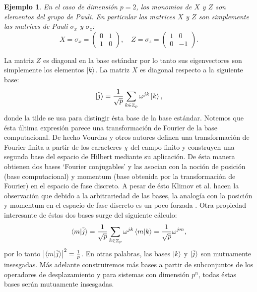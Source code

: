 \documentclass[a4paper]{report}
\DeclareMathOperator{\Z}{\mathbb{Z}}
\newtheorem{example}{Ejemplo}
\begin{document}
  \begin{example}
    En el caso de dimensión $p = 2$, los monomios de $X$ y
    $Z$ son elementos del \textit{grupo de Pauli}. En
    particular las matrices $X$ y $Z$ son simplemente las
    matrices de Pauli $\sigma_x$ y $\sigma_z$:
    \[
      X = \sigma_x =
      \begin{pmatrix} 0 & 1 \\ 1 & 0 \end{pmatrix},
      \quad
      Z = \sigma_z =
      \begin{pmatrix} 1 & 0 \\ 0 & -1 \end{pmatrix}. 
    \] 
  \end{example}
  La matriz $Z$ es diagonal en la base estándar por lo tanto
  sus eigenvectores son simplemente los elementos $\ket k$.
  La matriz $X$ es diagonal respecto a la siguiente base:
  \[
    \ket{\tilde j}
    = \frac{1}{\sqrt{p}} \sum_{k \in \Z_p}^{}
    \omega^{j k} \ket k,
  \] 
  donde la tilde se usa para distingir ésta base de la base
  estándar. Notemos que ésta última expresión parece una
  transformación de Fourier de la base computacional. De
  hecho Vourdas y otros autores definen una transformación
  de Fourier finita a partir de los caracteres $\chi$ del
  campo finito y construyen una segunda base del espacio de
  Hilbert mediante su aplicación. De ésta manera obtienen
  dos bases `Fourier conjugables' y las asocian con la
  noción de posición (base computacional) y momentum (base
  obtenida por la transformación de Fourier) en el espacio
  de fase discreto. A pesar de ésto Klimov et al. hacen la
  observación que debido a la arbitrariedad de las bases, la
  analogía con la posición y momentum en el espacio de fase
  discreto es un poco forzada \cite{bjork2008}. Otra
  propiedad interesante de éstas dos bases surge del
  siguiente cálculo:
  \begin{equation}
    \braket{m|\tilde j}
    = \frac{1}{\sqrt{p}}
    \sum_{k \in \Z_p}^{} \omega^{jk} \braket{m|k}
    = \frac{1}{\sqrt{p}} \omega^{jm},
  \end{equation}
  por lo tanto $\left|\braket{m|\tilde j}\right|^2 =
  \frac{1}{p}$. En otras palabras, las bases $\ket k$ y
  $\ket{\tilde j}$ son mutuamente insesgadas. Más adelante
  construiremos más bases a partir de subconjuntos de los
  operadores de desplazamiento y para sistemas con dimensión
  $p^{n}$, todas éstas bases serán mutuamente insesgadas.
\end{document}
